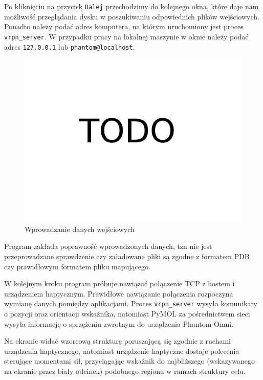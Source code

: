 \documentclass[licencjacka]{pracamgr}
\begin{document}
Po kliknięciu na przycisk \texttt{Dalej} przechodzimy do kolejnego okna, które daje nam możliwość przeglądania dysku w poszukiwaniu odpowiednich plików wejściowych. Ponadto należy podać adres komputera, na którym uruchomiony jest proces \texttt{vrpn\_server}. W przypadku pracy na lokalnej maszynie w oknie należy podać adres \texttt{127.0.0.1} lub \texttt{phantom@localhost}.

\begin{figure}[H]
\centering
\includegraphics[scale=0.3,center]{todo}
\caption{Wprowadzanie danych wejściowych}
\end{figure}

Program zakłada poprawność wprowadzonych danych, tzn nie jest przeprowadzane sprawdzenie czy załadowane pliki są zgodne z formatem PDB czy prawidłowym formatem pliku mapującego.

W kolejnym kroku program próbuje nawiązać połączenie TCP z hostem i urządzeniem haptycznym. Prawidłowe nawiązanie połączenia rozpoczyna wymianę danych pomiędzy aplikacjami. Proces \texttt{vrpn\_server} wysyła komunikaty o pozycji oraz orientacji wskaźnika, natomiast PyMOL za pośrednictwem sieci wysyła informację o sprzężeniu zwrotnym do urządzenia Phantom Omni. 

Na ekranie widać wzorcową strukturę poruszającą się zgodnie z ruchami urządzenia haptycznego, natomiast urządzenie haptyczne dostaje polecenia sterujące momentami sił, przyciągając wskaźnik do najbliższego (wskazywanego na ekranie przez biały odcinek) podobnego regionu w ramach struktury celu.
\end{document}
